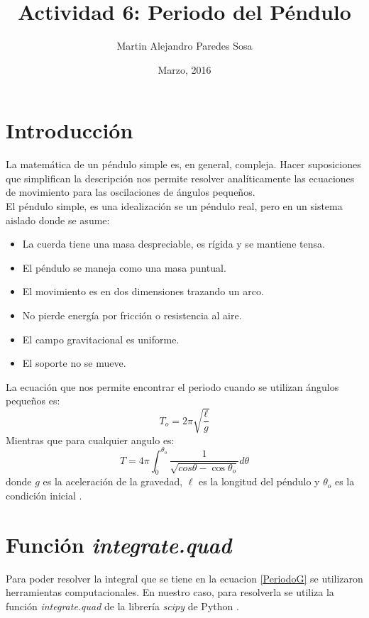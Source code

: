 \documentclass[12pt]{article}
\title{Actividad 6: Periodo del Péndulo}
\author{Martin Alejandro Paredes Sosa}
\date{Marzo, 2016}
\begin{document}
\maketitle

\section{Introducción}
La matemática de un péndulo simple es, en general, compleja. Hacer suposiciones que simplifican la descripción nos permite resolver analíticamente las ecuaciones de movimiento para las oscilaciones de ángulos pequeños.\\
El péndulo simple, es una idealización se un péndulo real, pero en un sistema aislado donde se asume:
\begin{itemize}
	\item La cuerda tiene una masa despreciable, es rígida y se mantiene tensa.
	\item El péndulo se maneja como una masa puntual.
	\item El movimiento es en dos dimensiones trazando un arco.
	\item No pierde energía por fricción o resistencia al aire.
	\item El campo gravitacional es uniforme.
	\item El soporte no se mueve.
\end{itemize}

La ecuación que nos permite encontrar el periodo cuando se utilizan ángulos pequeños es:
\begin{equation}\label{PeriodoP}
	T_o = 2\pi\sqrt{\frac{\ell}{g}}
\end{equation}
Mientras que para cualquier angulo es:
\begin{equation}\label{PeriodoG}
	T = 4\pi \int^{\theta_o}_0 \frac{1}{\sqrt{cos\theta-\cos\theta_o}}d\theta
\end{equation}
donde $g$ es la aceleración de la gravedad, $\ell$ es la longitud del péndulo y $\theta_o$ es la condición inicial \cite{PendWiki}.

\section{Función \emph{integrate.quad}}
Para poder resolver la integral que se tiene en la ecuacion \eqref{PeriodoG} se utilizaron herramientas computacionales. En nuestro caso, para resolverla se utiliza la función \emph{integrate.quad} de la librería \emph{scipy} de Python \cite{scipy}.
\end{document}
